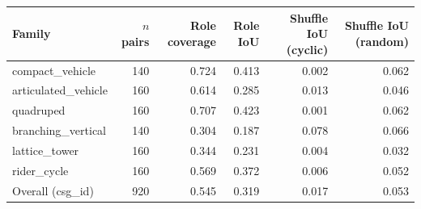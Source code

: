 \begin{tabular}{@{}lrrrrr@{}}
\toprule
Family & $n$ pairs & Role coverage & Role IoU & Shuffle IoU (cyclic) & Shuffle IoU (random) \\
\midrule
compact\_vehicle & 140 & 0.724 & 0.413 & 0.002 & 0.062 \\
articulated\_vehicle & 160 & 0.614 & 0.285 & 0.013 & 0.046 \\
quadruped & 160 & 0.707 & 0.423 & 0.001 & 0.062 \\
branching\_vertical & 140 & 0.304 & 0.187 & 0.078 & 0.066 \\
lattice\_tower & 160 & 0.344 & 0.231 & 0.004 & 0.032 \\
rider\_cycle & 160 & 0.569 & 0.372 & 0.006 & 0.052 \\
\midrule
Overall (csg\_id) & 920 & 0.545 & 0.319 & 0.017 & 0.053 \\
\bottomrule
\end{tabular}

